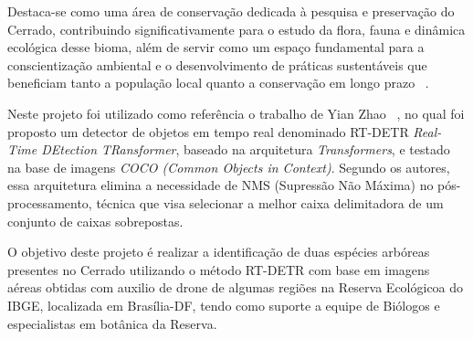 Destaca-se como uma área de conservação dedicada à pesquisa e preservação do Cerrado, contribuindo significativamente para o estudo da flora, fauna e dinâmica ecológica desse bioma, além de servir como um espaço fundamental para a conscientização ambiental e o desenvolvimento de práticas sustentáveis que beneficiam tanto a população local quanto a conservação em longo prazo ~\cite{camara2008musgos}.







Neste projeto foi utilizado como referência o trabalho de Yian Zhao \etal ~\cite{artigo2}, no qual foi proposto um detector de objetos em tempo real denominado RT-DETR \textit{ Real-Time DEtection TRansformer}, baseado na arquitetura \textit{Transformers}, e testado na base de imagens \textit{COCO (Common Objects in Context)}. Segundo os autores, essa arquitetura elimina a necessidade de NMS (Supressão Não Máxima) no pós-processamento, técnica que visa selecionar a melhor caixa delimitadora de um conjunto de caixas sobrepostas. 


O objetivo deste projeto é realizar a identificação de duas espécies arbóreas presentes no Cerrado utilizando o método RT-DETR com base em imagens aéreas obtidas com auxilio de drone de algumas regiões na Reserva Ecológicoa do IBGE, localizada em Brasília-DF, tendo como suporte a equipe de Biólogos e especialistas em botânica da Reserva. 

